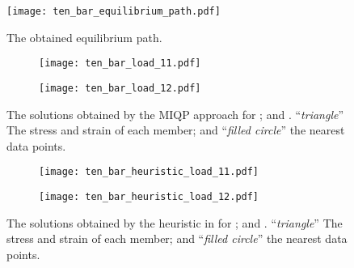 \documentclass[a4paper,11pt]{scrartcl}
\theoremstyle{plain}
\theoremstyle{definition}
\theoremstyle{remark}
\begin{document}
\begin{figure}[tp]
\centering
  \texttt{[image: ten\_bar\_equilibrium\_path.pdf]}
  \caption{The obtained equilibrium path. }
  \label{fig:ten_bar_equilibrium_path}
\end{figure}

\begin{figure}[tp]
\centering
  \begin{subfigure}[b]{0.47\textwidth}
    \centering
    \texttt{[image: ten\_bar\_load\_11.pdf]}
    \caption{}
    \label{fig:ten_bar_load_11}
  \end{subfigure}
  \hfill
  \begin{subfigure}[b]{0.47\textwidth}
    \centering
    \texttt{[image: ten\_bar\_load\_12.pdf]}
    \caption{}
    \label{fig:ten_bar_load_12}
  \end{subfigure}
  \caption{The solutions obtained by the MIQP approach for 
   ; and 
   . 
  ``{\em triangle\/}'' The stress and strain of each member; and 
  ``{\em filled circle\/}'' the nearest data points. 
  }
  \label{fig:ten_bar_load}
\par\bigskip
\centering
  \begin{subfigure}[b]{0.47\textwidth}
    \centering
    \texttt{[image: ten\_bar\_heuristic\_load\_11.pdf]}
    \caption{}
    \label{fig:ten_bar_heuristic_load_11}
  \end{subfigure}
  \hfill
  \begin{subfigure}[b]{0.47\textwidth}
    \centering
    \texttt{[image: ten\_bar\_heuristic\_load\_12.pdf]}
    \caption{}
    \label{fig:ten_bar_heuristic_load_12}
  \end{subfigure}
  \caption{The solutions obtained by the heuristic in \cite{KO16} for 
   ; and 
   . 
  ``{\em triangle\/}'' The stress and strain of each member; and 
  ``{\em filled circle\/}'' the nearest data points. 
  }
  \label{fig:ten_bar_heuristic_load}
\end{figure}
\end{document}
